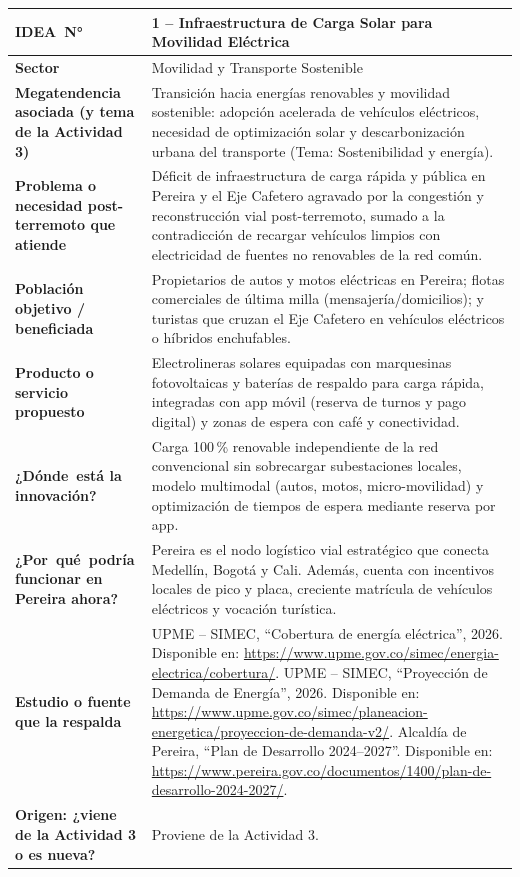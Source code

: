 \documentclass[11pt,a4paper]{article}
\newcommand{\fichaactividad}[9]{%
    \def\fIdea{#1}%
    \def\fSector{#2}%
    \def\fMega{#3}%
    \def\fProb{#4}%
    \def\fPobl{#5}%
    \def\fProd{#6}%
    \def\fInno{#7}%
    \def\fPere{#8}%
    \def\fFuen{#9}%
    \fichaactividadb%
}
\newcommand{\fichaactividadb}[1]{%
\begin{table}[H]
\centering
\sffamily
\renewcommand{\arraystretch}{1.52}
\setlength{\tabcolsep}{9pt}
\small
\begin{tabularx}{\textwidth}{|>{\centering\arraybackslash\bfseries\color{white}\columncolor{coloractualficha}\hsize=0.32\hsize}X|>{\arraybackslash\hsize=0.68\hsize}X|}
\hline
\mbox{IDEA N°} & \cellcolor{bgactualficha}\textbf{\color{coloractualficha}\fIdea} \\
\hline
Sector & \fSector \\
\hline
Megatendencia asociada (y tema de la Actividad 3) & \fMega \\
\hline
Problema o necesidad post-terremoto que atiende & \fProb \\
\hline
Población objetivo / beneficiada & \fPobl \\
\hline
Producto o servicio propuesto & \fProd \\
\hline
\mbox{¿Dónde está} la innovación? & \fInno \\
\hline
\mbox{¿Por qué podría} funcionar en Pereira ahora? & \fPere \\
\hline
Estudio o fuente que la respalda & \fFuen \\
\hline
Origen: ¿viene de la Actividad 3 o es nueva? & #1 \\
\hline
\end{tabularx}
\end{table}
}
\begin{document}
\fichaactividad
{1 -- Infraestructura de Carga Solar para Movilidad Eléctrica}
{Movilidad y Transporte Sostenible}
{Transición hacia energías renovables y movilidad sostenible: adopción acelerada de vehículos eléctricos, necesidad de optimización solar y descarbonización urbana del transporte (Tema: Sostenibilidad y energía).}
{Déficit de infraestructura de carga rápida y pública en Pereira y el Eje Cafetero agravado por la congestión y reconstrucción vial post-terremoto, sumado a la contradicción de recargar vehículos limpios con electricidad de fuentes no renovables de la red común.}
{Propietarios de autos y motos eléctricas en Pereira; flotas comerciales de última milla (mensajería/domicilios); y turistas que cruzan el Eje Cafetero en vehículos eléctricos o híbridos enchufables.}
{Electrolineras solares equipadas con marquesinas fotovoltaicas y baterías de respaldo para carga rápida, integradas con app móvil (reserva de turnos y pago digital) y zonas de espera con café y conectividad.}
{Carga 100\,\% renovable independiente de la red convencional sin sobrecargar subestaciones locales, modelo multimodal (autos, motos, micro-movilidad) y optimización de tiempos de espera mediante reserva por app.}
{Pereira es el nodo logístico vial estratégico que conecta Medellín, Bogotá y Cali. Además, cuenta con incentivos locales de pico y placa, creciente matrícula de vehículos eléctricos y vocación turística.}
{UPME -- SIMEC, ``Cobertura de energía eléctrica'', 2026. Disponible en: \url{https://www.upme.gov.co/simec/energia-electrica/cobertura/}. \newline
UPME -- SIMEC, ``Proyección de Demanda de Energía'', 2026. Disponible en: \url{https://www.upme.gov.co/simec/planeacion-energetica/proyeccion-de-demanda-v2/}. \newline
Alcaldía de Pereira, ``Plan de Desarrollo 2024--2027''. Disponible en: \url{https://www.pereira.gov.co/documentos/1400/plan-de-desarrollo-2024-2027/}.}
{Proviene de la Actividad 3.}

\newpage
\end{document}
